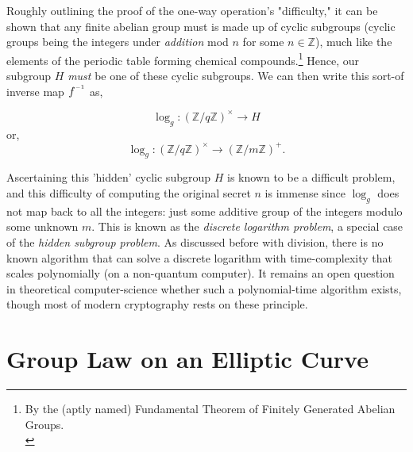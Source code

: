\documentclass[11pt, a4paper]{report}
\newcommand{\inv}{^{\raisebox{.2em}{$\scriptscriptstyle-1$}}}
\newcommand{\integers}{\mathbb{Z}}
\begin{document}
Roughly outlining the proof of the one-way operation's "difficulty," it can be shown that any finite abelian group must is made up of cyclic subgroups (cyclic groups being the integers under \textit{addition} mod $n$ for some $n \in \integers$), much like the elements of the periodic table forming chemical compounds.\footnote{By the (aptly named) Fundamental Theorem of Finitely Generated Abelian Groups. \\\autocite[134]{saracino}}
Hence, our subgroup $H$ \textit{must} be one of these cyclic subgroups.\autocite[43]{koblitz} We can then write this sort-of inverse map $f\inv$ as,

\[ \log_g : (\integers / q \integers)^{\times} \rightarrow H \]
or,
\[ \log_g : (\integers / q \integers)^{\times} \rightarrow (\integers / m \integers)^{+}. \]

Ascertaining this 'hidden' cyclic subgroup $H$ is known to be a difficult problem, and this difficulty of computing the original secret $n$ is immense since $\log_g$ does not map back to all the integers: just some additive group of the integers modulo some unknown $m$. This is known as the \textit{discrete logarithm problem}, a special case of the \textit{hidden subgroup problem}.\autocite[97]{koblitz} As discussed before with division, there is no known algorithm that can solve a discrete logarithm with time-complexity that scales polynomially (on a non-quantum computer). It remains an open question in theoretical computer-science whether such a polynomial-time algorithm exists, though most of modern cryptography rests on these principle.\autocite{lomont}


\section{Group Law on an Elliptic Curve}
\end{document}
